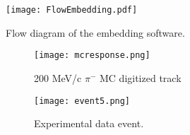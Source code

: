 





\begin{figure}[!htb]
\centering
\texttt{[image: FlowEmbedding.pdf]}
\caption{Flow diagram of the embedding software.}
\label{fig:flow}
\end{figure}


\begin{figure}[!htb]
    \centering
    \begin{subfigure}[t]{0.49\textwidth}
        \centering
        \texttt{[image: mcresponse.png]}
        \caption{200 MeV/c $\pi^-$ MC digitized track} \label{fig:mcevent}
    \end{subfigure}
    \hfill
    \begin{subfigure}[t]{.49\textwidth}
        \centering
        \texttt{[image: event5.png]} 
        \caption{Experimental data event.} \label{fig:dataevent}
    \end{subfigure}
    \caption{}
\label{fig:mcDataEmbedtrack}
\end{figure}



